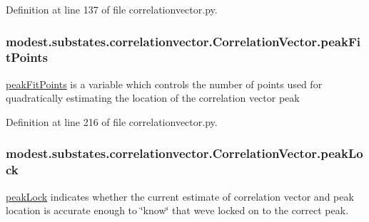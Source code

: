 Definition at line 137 of file correlationvector.\+py.

\subsubsection[{\texorpdfstring{peak\+Fit\+Points}{peakFitPoints}}]{\setlength{\rightskip}{0pt plus 5cm}modest.\+substates.\+correlationvector.\+Correlation\+Vector.\+peak\+Fit\+Points}\hypertarget{classmodest_1_1substates_1_1correlationvector_1_1CorrelationVector_af2be8d7129fd0453208af5268fdddc22}{}\label{classmodest_1_1substates_1_1correlationvector_1_1CorrelationVector_af2be8d7129fd0453208af5268fdddc22}


\hyperlink{classmodest_1_1substates_1_1correlationvector_1_1CorrelationVector_af2be8d7129fd0453208af5268fdddc22}{peak\+Fit\+Points} is a variable which controls the number of points used for quadratically estimating the location of the correlation vector peak 



Definition at line 216 of file correlationvector.\+py.

\subsubsection[{\texorpdfstring{peak\+Lock}{peakLock}}]{\setlength{\rightskip}{0pt plus 5cm}modest.\+substates.\+correlationvector.\+Correlation\+Vector.\+peak\+Lock}\hypertarget{classmodest_1_1substates_1_1correlationvector_1_1CorrelationVector_aefa1ac05666047998606ffd9f7d984ab}{}\label{classmodest_1_1substates_1_1correlationvector_1_1CorrelationVector_aefa1ac05666047998606ffd9f7d984ab}


\hyperlink{classmodest_1_1substates_1_1correlationvector_1_1CorrelationVector_aefa1ac05666047998606ffd9f7d984ab}{peak\+Lock} indicates whether the current estimate of correlation vector and peak location is accurate enough to \char`\"{}know\char`\"{} that we\textquotesingle{}ve locked on to the correct peak. 



